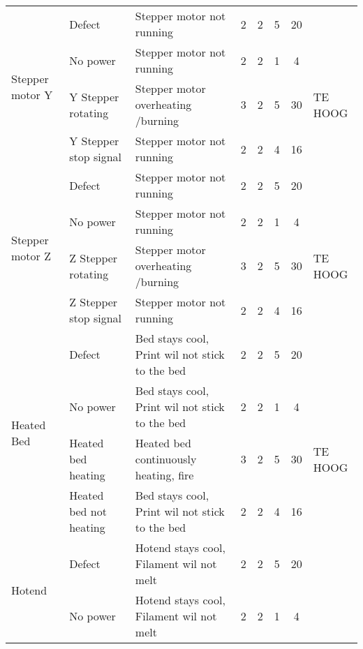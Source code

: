 \begin{landscape}
\begin{longtable}{|l|l|l|c|c|c|c|l|}
        \multirow{4}{*}{Stepper motor Y}    & Defect                & Stepper motor not running             & 2 & 2 & 5 & 20 & \\
                                            & No power              & Stepper motor not running             & 2 & 2 & 1 &  4 & \\
                                            & Y Stepper rotating    & Stepper motor overheating /burning    & 3 & 2 & 5 & 30 & TE HOOG \\
                                            & Y Stepper stop signal & Stepper motor not running             & 2 & 2 & 4 & 16 & \\ 
                                            \hline
        \multirow{4}{*}{Stepper motor Z}    & Defect                & Stepper motor not running             & 2 & 2 & 5 & 20 & \\
                                            & No power              & Stepper motor not running             & 2 & 2 & 1 &  4 & \\
                                            & Z Stepper rotating    & Stepper motor overheating /burning    & 3 & 2 & 5 & 30 & TE HOOG \\
                                            & Z Stepper stop signal & Stepper motor not running             & 2 & 2 & 4 & 16 & \\ 
                                            \hline 
        \multirow{4}{*}{Heated Bed}         & Defect                    & Bed stays cool, Print wil not stick to the bed    & 2 & 2 & 5 & 20 & \\
                                            & No power                  & Bed stays cool, Print wil not stick to the bed    & 2 & 2 & 1 &  4 & \\
                                            & Heated bed heating        & Heated bed continuously heating, fire             & 3 & 2 & 5 & 30 & TE HOOG \\
                                            & Heated bed not heating    & Bed stays cool, Print wil not stick to the bed    & 2 & 2 & 4 & 16 & \\ 
                                            \hline 
        \multirow{4}{*}{Hotend}             & Defect                    & Hotend stays cool, Filament wil not melt          & 2 & 2 & 5 & 20 & \\
                                            & No power                  & Hotend stays cool, Filament wil not melt          & 2 & 2 & 1 &  4 & \\

\end{longtable}
\end{landscape}
